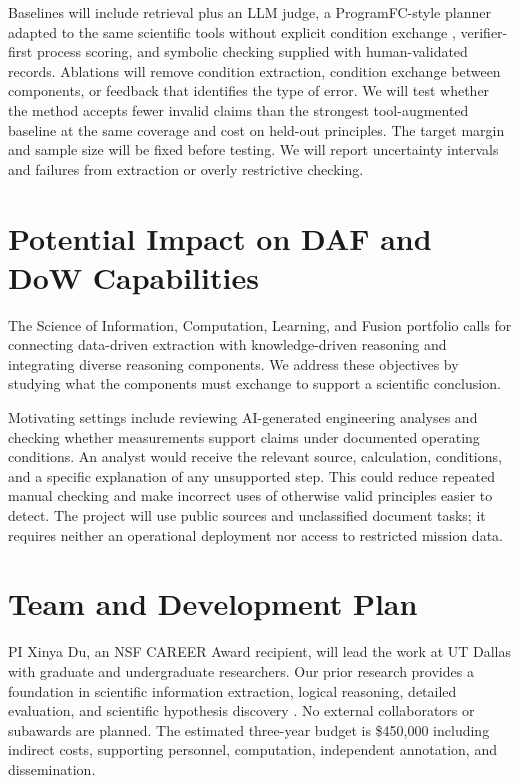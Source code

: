 \documentclass[12pt]{article}
\begin{document}
Baselines will include retrieval plus an LLM judge, a ProgramFC-style planner adapted to the same scientific tools without explicit condition exchange \citep{pan2023programfc}, verifier-first process scoring, and symbolic checking supplied with human-validated records. Ablations will remove condition extraction, condition exchange between components, or feedback that identifies the type of error. We will test whether the method accepts fewer invalid claims than the strongest tool-augmented baseline at the same coverage and cost on held-out principles. The target margin and sample size will be fixed before testing. We will report uncertainty intervals and failures from extraction or overly restrictive checking.

\section*{Potential Impact on DAF and DoW Capabilities}

The Science of Information, Computation, Learning, and Fusion portfolio calls for connecting data-driven extraction with knowledge-driven reasoning and integrating diverse reasoning components. We address these objectives by studying what the components must exchange to support a scientific conclusion.

Motivating settings include reviewing AI-generated engineering analyses and checking whether measurements support claims under documented operating conditions. An analyst would receive the relevant source, calculation, conditions, and a specific explanation of any unsupported step. This could reduce repeated manual checking and make incorrect uses of otherwise valid principles easier to detect. The project will use public sources and unclassified document tasks; it requires neither an operational deployment nor access to restricted mission data.

\section*{Team and Development Plan}

PI Xinya Du, an NSF CAREER Award recipient, will lead the work at UT Dallas with graduate and undergraduate researchers. Our prior research provides a foundation in scientific information extraction, logical reasoning, detailed evaluation, and scientific hypothesis discovery \citep{dong2025scievent,han2023clore,li2025fgprm,yang2024hypotheses}. No external collaborators or subawards are planned. The estimated three-year budget is \$450,000 including indirect costs, supporting personnel, computation, independent annotation, and dissemination.
\end{document}
